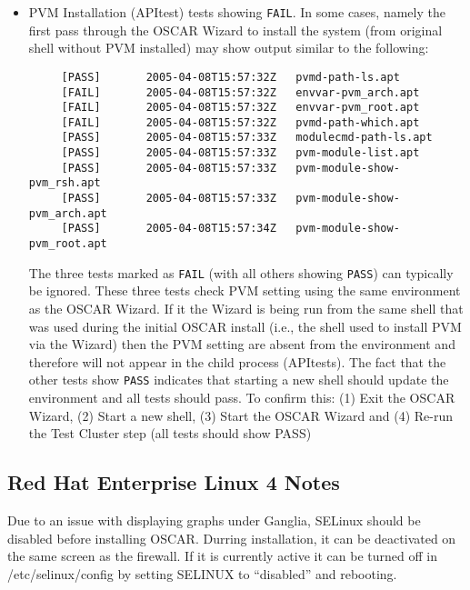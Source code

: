 \begin{itemize}
\item PVM Installation (APItest) tests showing {\tt FAIL}.  In some cases,
  namely the first pass through the OSCAR Wizard to install the system (from
  original shell without PVM installed) may show output similar to the
  following:
  \begin{small}
  \begin{verbatim}
     [PASS]       2005-04-08T15:57:32Z   pvmd-path-ls.apt
     [FAIL]       2005-04-08T15:57:32Z   envvar-pvm_arch.apt
     [FAIL]       2005-04-08T15:57:32Z   envvar-pvm_root.apt
     [FAIL]       2005-04-08T15:57:32Z   pvmd-path-which.apt
     [PASS]       2005-04-08T15:57:33Z   modulecmd-path-ls.apt
     [PASS]       2005-04-08T15:57:33Z   pvm-module-list.apt
     [PASS]       2005-04-08T15:57:33Z   pvm-module-show-pvm_rsh.apt
     [PASS]       2005-04-08T15:57:33Z   pvm-module-show-pvm_arch.apt
     [PASS]       2005-04-08T15:57:34Z   pvm-module-show-pvm_root.apt
  \end{verbatim}
  \end{small}

  The three tests marked as {\tt FAIL} (with all others showing {\tt PASS})
  can typically be ignored.  These three tests check PVM setting using the
  same environment as the OSCAR Wizard.  If it the Wizard is being run from
  the same shell that was used during the initial OSCAR install (i.e., the
  shell used to install PVM via the Wizard) then the PVM setting are absent
  from the environment and therefore will not appear in the child process
  (APItests).  The fact that the other tests show {\tt PASS} indicates that
  starting a new shell should update the environment and all tests should
  pass.  To confirm this:
  (1) Exit the OSCAR Wizard, (2) Start a new shell,
  (3) Start the OSCAR Wizard and (4) Re-run the Test Cluster step
  (all tests should show PASS)


\end{itemize}


\subsection{Red Hat Enterprise Linux 4 Notes}
\label{subsec:rhel4notes}

  Due to an issue with displaying graphs under Ganglia, SELinux should
  be disabled before installing OSCAR.  Durring installation, it can be
  deactivated on the same screen as the firewall.  If it is currently
  active it can be turned off in /etc/selinux/config by setting SELINUX 
  to ``disabled'' and rebooting.


